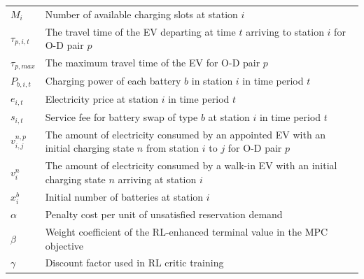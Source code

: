 \documentclass[12pt,hyperref,a4paper,UTF8]{ctexart}
\begin{document}
\begin{table}[!htbp]
\begin{tabular}{@{}lp{13cm}@{}}
    $M_i$ & Number of available charging slots at station $i$ \\
    $\tau_{p,i,t}$ & The travel time of the EV departing at time $t$ arriving to station $i$ for O-D pair $p$\\
    $\tau_{p,max}$ & The maximum travel time of the EV for O-D pair $p$\\
    $P_{b,i,t}$ & Charging power of each battery $b$ in station $i$ in time period $t$\\
    $e_{i,t}$ & Electricity price at station $i$ in time period $t$\\
    $s_{i,t}$ & Service fee for battery swap of type $b$ at station $i$ in time period $t$\\
    $v^{n,p}_{i,j}$ & The amount of electricity consumed by an appointed EV with an initial charging state $n$ from station $i$ to $j$ for O-D pair $p$\\
    $v^{n}_{i}$ & The amount of electricity consumed by a walk-in EV with an initial charging state $n$ arriving at station $i$\\
    $x_i^b$ & Initial number of batteries at station $i$ \\
    $\alpha$ & Penalty cost per unit of unsatisfied reservation demand\\
    $\beta$ & Weight coefficient of the RL-enhanced terminal value in the MPC objective \\
    $\gamma$ & Discount factor used in RL critic training \\

\end{tabular}
\end{table}
\end{document}
